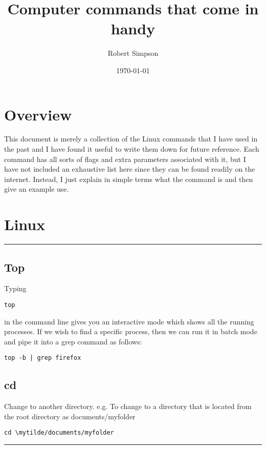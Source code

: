 \documentclass[a4paper, 10pt]{article}
\title{Computer commands that come in handy}
\author{Robert Simpson}
\date{\today}
\newcommand{\mytilde}{$\sim$}
\newcommand{\mytoprule}{\hrule\vspace{4mm}}
\newcommand{\mybotrule}{\vspace{4mm}\hrule}
\begin{document}
\maketitle

\section*{Overview}
This document is merely a collection of the Linux commands that I have used in the past and I have found it useful to write them down for future reference. Each command has all sorts of flags and extra parameters associated with it, but I have not included an exhaustive list here since they can be found readily on the internet. Instead, I just explain in simple terms what the command is and then give an example use.

\section*{Linux}

\mytoprule
\subsection*{Top}
\label{sec:top}

Typing
\begin{verbatim}
top
\end{verbatim}
in the command line gives you an interactive mode which shows all the
running processes. If we wish to find a specific process, then we can
run it in batch mode and pipe it into a grep command as follows:
\begin{verbatim}
top -b | grep firefox
\end{verbatim}


\subsection*{cd}
Change to another directory. e.g. To change to a directory that is located from the root directory as documents/myfolder
\begin{Verbatim}[commandchars=\\\{\}]
cd \mytilde/documents/myfolder
\end{Verbatim}
\mybotrule
\end{document}
